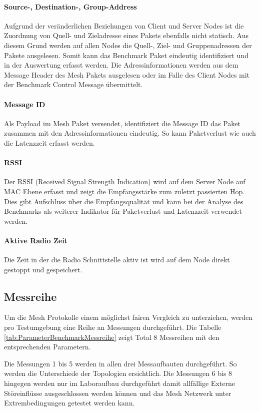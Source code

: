 \paragraph{Source-, Destination-, Group-Address}
Aufgrund der veränderlichen Beziehungen von Client und Server Nodes ist die Zuordnung von Quell- und Zieladresse eines Pakets ebenfalls nicht statisch. Aus diesem Grund werden auf allen Nodes die Quell-, Ziel- und Gruppenadressen der Pakete ausgelesen. 
Somit kann das Benchmark Paket eindeutig identifiziert und in der Auswertung erfasst werden.
Die Adressinformationen werden aus dem Message Header des Mesh Pakets ausgelesen oder im Falle des Client Nodes mit der Benchmark Control Message übermittelt.

\paragraph{Message ID}
Als Payload im Mesh Paket versendet, identifiziert die Message ID das Paket zusammen mit den Adressinformationen eindeutig. So kann Paketverlust wie auch die Latenzzeit erfasst werden.

\paragraph{RSSI}
Der RSSI (Received Signal Strength Indication) wird auf dem Server Node auf MAC Ebene erfasst und zeigt die Empfangsstärke zum zuletzt passierten Hop. Dies gibt Aufschluss über die Empfangsqualität und kann bei der Analyse des Benchmarks als weiterer Indikator für Paketverlust und Latenzzeit verwendet werden.

\paragraph{Aktive Radio Zeit}
Die Zeit in der die Radio Schnittstelle aktiv ist wird auf dem Node direkt gestoppt und gespeichert.


\subsection{Messreihe}\label{subsec:Messreihe}
Um die Mesh Protokolle einem möglichst fairen Vergleich zu unterziehen, werden pro Testumgebung eine Reihe an Messungen durchgeführt. Die Tabelle \ref{tab:ParameterBenchmarkMessreihe} zeigt Total 8 Messreihen mit den entsprechenden Parametern.

Die Messungen 1 bis 5 werden in allen drei Messaufbauten durchgeführt. So werden die Unterschiede der Topologien ersichtlich.
Die Messungen 6 bis 8 hingegen werden nur im Laboraufbau durchgeführt damit allfällige Externe Störeinflüsse ausgeschlossen werden können und das Mesh Netzwerk unter Extrembedingungen getestet werden kann.

